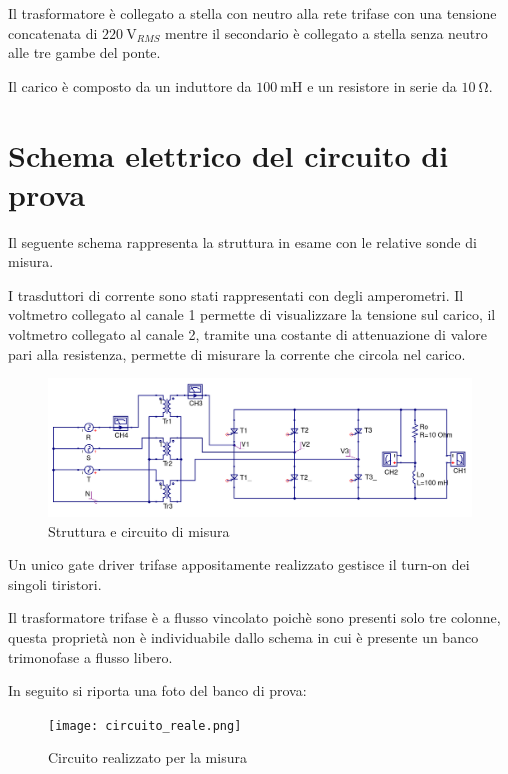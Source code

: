 \documentclass[a4paper,10pt]{article}
\begin{document}
Il trasformatore è collegato a stella con neutro alla rete trifase con una tensione
concatenata di $\SI{220}{\volt_{RMS}}$ mentre il secondario è collegato a stella 
senza neutro alle tre gambe del ponte.

Il carico è composto da un induttore da $\SI{100}{\milli\henry}$ e
un resistore in serie da $\SI{10}{\ohm}$.



\section{Schema elettrico del circuito di prova}
Il seguente schema rappresenta la struttura in esame con le relative sonde
di misura.

I trasduttori di corrente sono stati rappresentati con degli
amperometri. Il voltmetro collegato al canale 1 permette di visualizzare la 
tensione sul carico, il voltmetro collegato al canale 2, tramite una costante di 
attenuazione di valore pari alla resistenza, permette di misurare 
la corrente che circola nel carico.


\begin{figure}[H]
 \centering
 \includegraphics[keepaspectratio=true,width=1\linewidth]{circuito_qucs.png}
 \caption{Struttura e circuito di misura}
 \label{fig:circuito}
\end{figure}

Un unico gate driver trifase appositamente realizzato gestisce il turn-on
dei singoli tiristori.

Il trasformatore trifase è a flusso vincolato poichè sono presenti 
solo tre colonne, questa proprietà non è individuabile dallo schema in cui 
è presente un banco trimonofase a flusso libero.

In seguito si riporta una foto del banco di prova:
\begin{figure}[H]
 \centering
 \texttt{[image: circuito\_reale.png]}
 \caption{Circuito realizzato per la misura}
 \label{fig:circuito_reale}
\end{figure}
\end{document}
